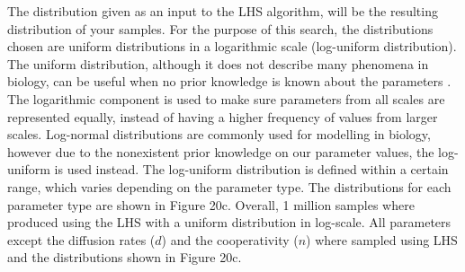 The distribution given as an input to the LHS algorithm, will be the resulting distribution of your samples. For the purpose of this search, the distributions chosen are uniform distributions in a logarithmic scale (log-uniform distribution). The uniform distribution, although it does not describe many phenomena in biology, can be useful when no prior knowledge is known about the parameters \parencite{Frank2009TheNature}. The logarithmic component is used to make sure parameters from all scales are represented equally, instead of having a higher frequency of values from larger scales. Log-normal distributions are commonly used for modelling in biology, however due to the nonexistent prior knowledge on our parameter values, the log-uniform is used instead. The log-uniform distribution is defined within a certain range, which varies depending on the parameter type. The distributions for each parameter type are shown in Figure 20c. Overall, 1 million samples where produced using the LHS with a uniform distribution in log-scale. All parameters except the diffusion rates ($d$) and the cooperativity ($n$) where sampled using LHS and the distributions shown in Figure 20c.


